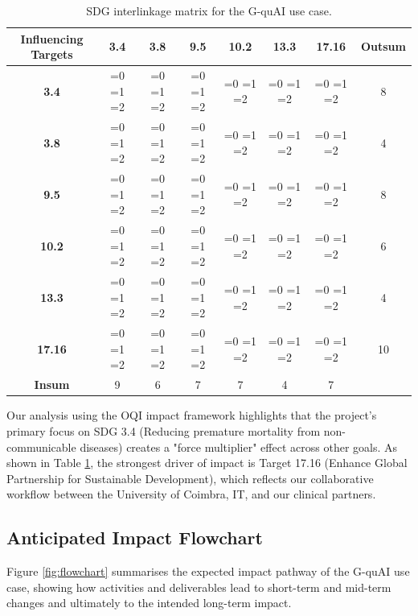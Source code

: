 \documentclass{oqireport}
\newcommand{\cellcolorvalue}[1]{%
\ifnum#1=0 \cellcolor{cellzero}%
\else\ifnum#1=1 \cellcolor{cellone}%
\else\ifnum#1=2 \cellcolor{celltwo}%
\else\cellcolor{cellthree}%
\fi\fi\fi
#1}
\begin{document}
\begin{table}[H]
\centering
\renewcommand{\arraystretch}{1.35}
\setlength{\tabcolsep}{6pt}
\small
\begin{tabular}{|c|c|c|c|c|c|c|c|}
\hline
\rowcolor{gray!15}
\textbf{Influencing Targets} & \textbf{3.4} & \textbf{3.8} & \textbf{9.5} & \textbf{10.2} & \textbf{13.3} & \textbf{17.16} & \textbf{Outsum} \\
\hline
\textbf{3.4}   & \cellcolorvalue{0} & \cellcolorvalue{2} & \cellcolorvalue{2} & \cellcolorvalue{2} & \cellcolorvalue{1} & \cellcolorvalue{1} & 8 \\
\hline
\textbf{3.8}   & \cellcolorvalue{1} & \cellcolorvalue{0} & \cellcolorvalue{1} & \cellcolorvalue{1} & \cellcolorvalue{0} & \cellcolorvalue{1} & 4 \\
\hline
\textbf{9.5}   & \cellcolorvalue{2} & \cellcolorvalue{1} & \cellcolorvalue{0} & \cellcolorvalue{1} & \cellcolorvalue{2} & \cellcolorvalue{2} & 8 \\
\hline
\textbf{10.2}  & \cellcolorvalue{2} & \cellcolorvalue{1} & \cellcolorvalue{1} & \cellcolorvalue{0} & \cellcolorvalue{0} & \cellcolorvalue{2} & 6 \\
\hline
\textbf{13.3}  & \cellcolorvalue{1} & \cellcolorvalue{0} & \cellcolorvalue{1} & \cellcolorvalue{1} & \cellcolorvalue{0} & \cellcolorvalue{1} & 4 \\
\hline
\textbf{17.16} & \cellcolorvalue{3} & \cellcolorvalue{2} & \cellcolorvalue{2} & \cellcolorvalue{2} & \cellcolorvalue{1} & \cellcolorvalue{0} & 10 \\
\hline
\textbf{Insum}  & 9 & 6 & 7 & 7 & 4 & 7 & \\
\hline
\end{tabular}
\caption{SDG interlinkage matrix for the G-quAI use case.}
\label{tab:sdg-interlinkage}
\end{table}

Our analysis using the OQI impact framework highlights that the project's primary focus on SDG 3.4 (Reducing premature mortality from non-communicable diseases) creates a "force multiplier" effect across other goals. As shown in Table \ref{tab:sdg-interlinkage}, the strongest driver of impact is Target 17.16 (Enhance Global Partnership for Sustainable Development), which reflects our collaborative workflow between the University of Coimbra, IT, and our clinical partners.


\subsection{Anticipated Impact Flowchart}
Figure \ref{fig:flowchart} summarises the expected impact pathway of the G-quAI use case, showing how activities and deliverables lead to short-term and mid-term changes and ultimately to the intended long-term impact.
\end{document}

